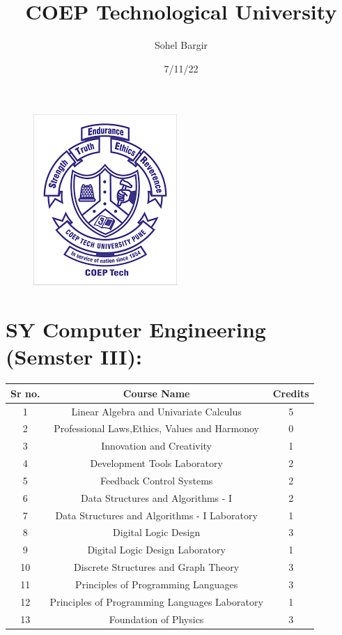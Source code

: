 \documentclass[12pt,a4pages]{article}
\title{COEP Technological University}
\date{7/11/22}
\author{Sohel Bargir}
\begin{document}
\maketitle
\newpage

\begin{figure}[h]
\centering
\includegraphics[scale=.5]{coep}
\end{figure}

\begin{table}


\section{SY Computer Engineering (Semster III):}
\begin{center}
\begin{tabular}{ |c|c|c| } 

\hline

\textbf{Sr no.   }&
\textbf{Course Name   }&
\textbf{Credits  }\\


 \hline
1  &  Linear Algebra and Univariate Calculus  &  5 \\
2  &  Professional Laws,Ethics, Values and Harmonoy  & 0 \\
3  &  Innovation and Creativity &  1 \\
4  &  Development Tools Laboratory  & 2 \\
5  &  Feedback Control Systems  &  2 \\
6  &  Data Structures and Algorithms - I  & 2 \\
7  &  Data Structures and Algorithms - I Laboratory &  1 \\
8  &  Digital Logic Design  &  3 \\
9  &  Digital Logic Design Laboratory & 1 \\
10  &  Discrete Structures and Graph Theory  & 3 \\
11  &  Principles of Programming Languages  &  3 \\
12  &  Principles of Programming Languages Laboratory  &  1 \\
13  &  Foundation of Physics &  3 \\

 \hline
\end{tabular}
\end{center}
\end{table}
\end{document}
